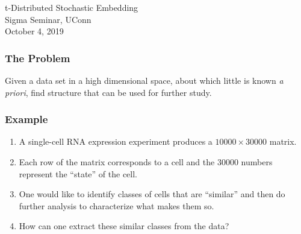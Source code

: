 \documentclass{beamer}
\begin{document}
\begin{frame}
  \begin{center}
    t-Distributed Stochastic Embedding \\
    Sigma Seminar, UConn \\
    October 4, 2019
  \end{center}
\end{frame}
\begin{frame}
  \frametitle{The Problem}
  
    Given a data set in a high dimensional space, about which little is known {\it a priori},
    find structure that can be used for further study.
  
\end{frame}
\begin{frame}
  \frametitle{Example}
  \begin{enumerate}
  \item A single-cell RNA expression experiment produces a $10000\times 30000$ matrix.
  \item Each row of the matrix corresponds to a cell and the $30000$ numbers represent the ``state'' of the cell.
  \item One would like to identify classes of cells that are ``similar'' and then do further analysis to characterize what makes them so.
  \item How can one extract these similar classes from the data?
  \end{enumerate}
\end{frame}
\end{document}
